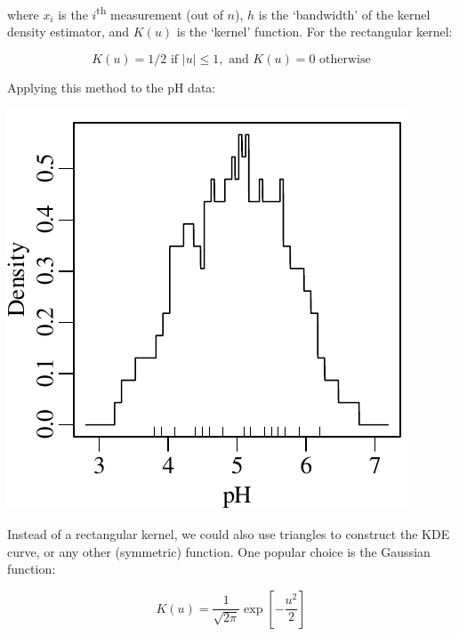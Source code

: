 \noindent where $x_i$ is the $i$\textsuperscript{th} measurement (out
of $n$), $h$ is the `bandwidth' of the kernel density estimator, and
$K(u)$ is the `kernel' function. For the rectangular kernel:

\begin{equation}
  K(u) = 1/2 \mbox{~if~}|u| \leq 1, \mbox{~and~} K(u) = 0 \mbox{~otherwise}
\end{equation}

Applying this method to the pH data:

\noindent\begin{minipage}[t][][b]{.3\textwidth}
  \includegraphics[width=\textwidth]{../figures/pHrectKDE.pdf}
\end{minipage}
\begin{minipage}[t][][t]{.7\textwidth}
  \label{fig:pHrectKDE}
\end{minipage}

Instead of a rectangular kernel, we could also use triangles to
construct the KDE curve, or any other (symmetric) function. One
popular choice is the Gaussian function:

\begin{equation}
  K(u) = \frac{1}{\sqrt{2\pi}}\exp\!\left[-\frac{u^2}{2}\right]
  \label{eq:gaussiankernel}
\end{equation}

